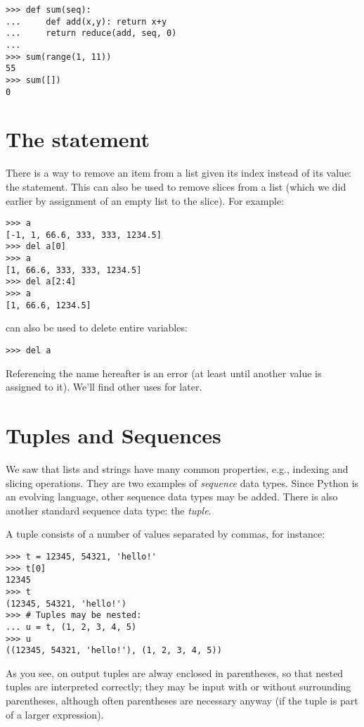 \documentclass{manual}
\begin{document}
\begin{verbatim}
>>> def sum(seq):
...     def add(x,y): return x+y
...     return reduce(add, seq, 0)
... 
>>> sum(range(1, 11))
55
>>> sum([])
0
\end{verbatim}

\section{The  statement \label{del}}

There is a way to remove an item from a list given its index instead
of its value: the  statement.  This can also be used to
remove slices from a list (which we did earlier by assignment of an
empty list to the slice).  For example:

\begin{verbatim}
>>> a
[-1, 1, 66.6, 333, 333, 1234.5]
>>> del a[0]
>>> a
[1, 66.6, 333, 333, 1234.5]
>>> del a[2:4]
>>> a
[1, 66.6, 1234.5]
\end{verbatim}

 can also be used to delete entire variables:

\begin{verbatim}
>>> del a
\end{verbatim}

Referencing the name  hereafter is an error (at least until
another value is assigned to it).  We'll find other uses for
 later.

\section{Tuples and Sequences \label{tuples}}

We saw that lists and strings have many common properties, e.g.,
indexing and slicing operations.  They are two examples of
\emph{sequence} data types.  Since Python is an evolving language,
other sequence data types may be added.  There is also another
standard sequence data type: the \emph{tuple}.

A tuple consists of a number of values separated by commas, for
instance:

\begin{verbatim}
>>> t = 12345, 54321, 'hello!'
>>> t[0]
12345
>>> t
(12345, 54321, 'hello!')
>>> # Tuples may be nested:
... u = t, (1, 2, 3, 4, 5)
>>> u
((12345, 54321, 'hello!'), (1, 2, 3, 4, 5))
\end{verbatim}

As you see, on output tuples are alway enclosed in parentheses, so
that nested tuples are interpreted correctly; they may be input with
or without surrounding parentheses, although often parentheses are
necessary anyway (if the tuple is part of a larger expression).
\end{document}
